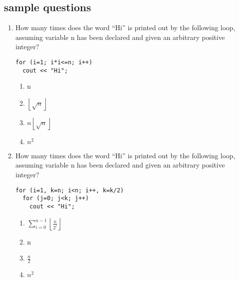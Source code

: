 \subsection{sample questions}
\begin{enumerate}
\item How many times does the word ``Hi'' is printed out by the following loop, assuming variable n has been declared and given an arbitrary positive integer?
  \begin{lstlisting}
for (i=1; i*i<=n; i++)
  cout << "Hi";
  \end{lstlisting}
  \begin{enumerate}
  \item n
  \item $\left\lfloor\sqrt{n}\right\rfloor$
  \item $n\left\lfloor\sqrt{n}\right\rfloor$
  \item $n^{2}$
  \end{enumerate}
\item How many times does the word ``Hi'' is printed out by the following loop, assuming variable n has been declared and given an arbitrary positive integer?
  \begin{lstlisting}
for (i=1, k=n; i<n; i++, k=k/2)
  for (j=0; j<k; j++)
    cout << "Hi";
  \end{lstlisting}
  \begin{enumerate}
  \item $\sum\limits_{i=0}^{n-1}\left\lfloor\frac{n}{2^{i}}\right\rfloor$
  \item n
  \item $\frac{n}{2}$
  \item $n^{2}$
  \end{enumerate}
\end{enumerate}
